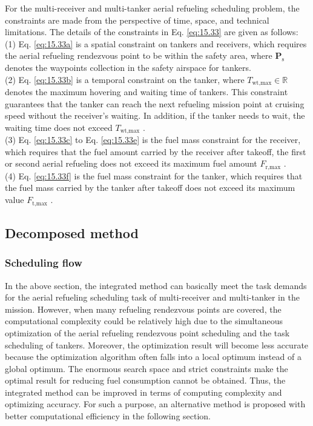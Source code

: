 For the multi-receiver and multi-tanker aerial refueling scheduling problem, the constraints are made from the perspective of time, space, and technical limitations. The details of the constraints in Eq. \ref{eq:15.33} are given as follows:
(1)	Eq. \ref{eq:15.33a}  is a spatial constraint on tankers and receivers, which requires the aerial refueling rendezvous point to be within the safety area, where $\mathbf{P}_{\text{s}}$  denotes the waypoints collection in the safety airspace for tankers. \\
(2)	Eq. \ref{eq:15.33b} is a temporal constraint on the tanker, where  $T_{\text{wt},\text{max}}\in\mathbb{R}$ denotes the maximum hovering and waiting time of tankers. This constraint guarantees that the tanker can reach the next refueling mission point at cruising speed without the receiver's waiting. In addition, if the tanker needs to wait, the waiting time does not exceed $T_{\text{wt},\text{max}}$ . \\
(3)	Eq. \ref{eq:15.33c} to Eq. \ref{eq:15.33e} is the fuel mass constraint for the receiver, which requires that the fuel amount carried by the receiver after takeoff, the first or second aerial refueling does not exceed its maximum fuel amount  $F_{\text{r},\text{max}}$ . \\
(4)	Eq. \ref{eq:15.33f} is the fuel mass constraint for the tanker, which requires that the fuel mass carried by the tanker after takeoff does not exceed its maximum value $F_{\text{t},\text{max}}$ .

\subsection{Decomposed method}
\subsubsection{Scheduling flow}

In the above section, the integrated method can basically meet the task demands for the aerial refueling scheduling task of multi-receiver and multi-tanker in the mission. However, when many refueling rendezvous points are covered, the computational complexity could be relatively high due to the simultaneous optimization of the aerial refueling rendezvous point scheduling and the task scheduling of tankers. Moreover, the optimization result will become less accurate because the optimization algorithm often falls into a local optimum instead of a global optimum. The enormous search space and strict constraints make the optimal result for reducing fuel consumption cannot be obtained. Thus, the integrated method can be improved in terms of computing complexity and optimizing accuracy. For such a purpose, an alternative method is proposed with better computational efficiency in the following section.

